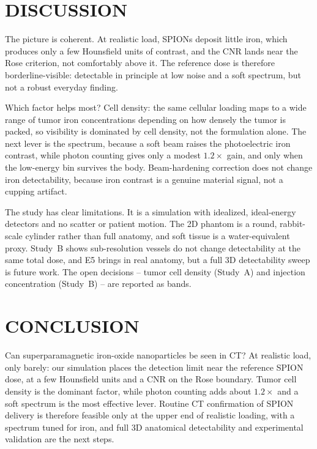 \documentclass[]{spie}  %
\begin{document}
\section{DISCUSSION}
\label{sec:discussion}

The picture is coherent. At realistic load, SPIONs deposit little iron, which
produces only a few Hounsfield units of contrast, and the CNR lands near the Rose
criterion, not comfortably above it. The reference dose is therefore
borderline-visible: detectable in principle at low noise and a soft spectrum, but not
a robust everyday finding.

Which factor helps most? Cell density: the same cellular loading maps to a wide range
of tumor iron concentrations depending on how densely the tumor is packed, so
visibility is dominated by cell density, not the formulation alone. The next lever is
the spectrum, because a soft beam raises the photoelectric iron contrast, while photon
counting gives only a modest $1.2\times$ gain, and only when the low-energy bin
survives the body. Beam-hardening correction does not change iron detectability,
because iron contrast is a genuine material signal, not a cupping artifact.

The study has clear limitations. It is a simulation with idealized, ideal-energy
detectors and no scatter or patient motion. The 2D phantom is a round, rabbit-scale
cylinder rather than full anatomy, and soft tissue is a water-equivalent proxy.
Study~B shows sub-resolution vessels do not change detectability at the same total
dose, and E5 brings in real anatomy, but a full 3D detectability sweep is future
work. The open decisions -- tumor cell density (Study~A) and injection concentration
(Study~B) -- are reported as bands.

\section{CONCLUSION}
\label{sec:conclusion}

Can superparamagnetic iron-oxide nanoparticles be seen in CT? At realistic load, only
barely: our simulation places the detection limit near the reference
SPION dose, at a few Hounsfield units and a CNR on the Rose boundary. Tumor cell
density is the dominant factor, while photon counting adds about $1.2\times$ and a
soft spectrum is the most effective lever. Routine CT confirmation of SPION delivery
is therefore feasible only at the upper end of realistic loading, with a spectrum
tuned for iron, and full 3D anatomical detectability and experimental validation are
the next steps.
\end{document}
